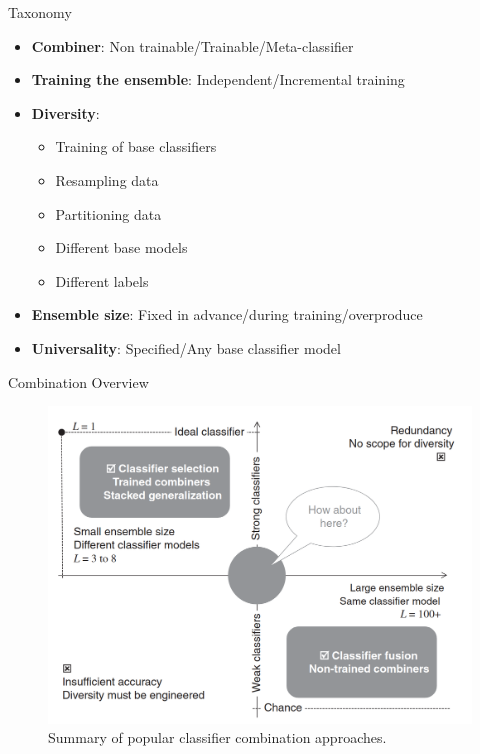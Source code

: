 \documentclass[xcolor=table]{beamer}
\begin{document}
\begin{frame}{Taxonomy}
    \begin{itemize}
        \item \textbf{Combiner}: Non trainable/Trainable/Meta-classifier
        \item \textbf{Training the ensemble}: Independent/Incremental training
        \item \textbf{Diversity}:
        \begin{itemize}
            \item Training of base classifiers
            \item Resampling data
            \item Partitioning data
            \item Different base models
            \item Different labels
        \end{itemize}
        \item \textbf{Ensemble size}: Fixed in advance/during training/overproduce
        \item \textbf{Universality}: Specified/Any base classifier model
    \end{itemize}
\end{frame}


\begin{frame}{Combination Overview}
    \begin{figure}
        \centering
        \includegraphics[scale=0.15]{Images/CombinationApproaches.png}
        \caption{Summary of popular classifier combination approaches.}
    \end{figure}
\end{frame}
\end{document}
